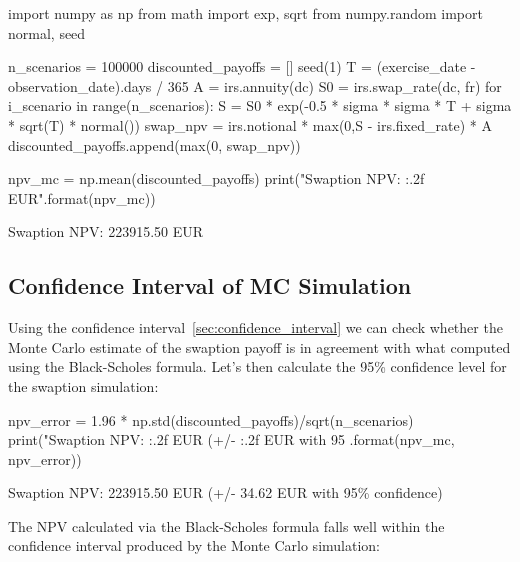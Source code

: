\begin{ipython}
import numpy as np
from math import exp, sqrt
from numpy.random import normal, seed

n_scenarios = 100000
discounted_payoffs = []
seed(1)
T = (exercise_date - observation_date).days / 365
A = irs.annuity(dc)
S0 = irs.swap_rate(dc, fr)
for i_scenario in range(n_scenarios):
    S = S0 * exp(-0.5 * sigma * sigma * T +
        sigma * sqrt(T) * normal())
    swap_npv = irs.notional * max(0,S - irs.fixed_rate) * A
    discounted_payoffs.append(max(0, swap_npv))

npv_mc = np.mean(discounted_payoffs)
print("Swaption NPV: {:.2f} EUR".format(npv_mc))
\end{ipython}
\begin{ioutput}
Swaption NPV: 223915.50 EUR
\end{ioutput}

%

\subsection{Confidence Interval of MC Simulation}

Using the confidence interval~\ref{sec:confidence_interval} we can check whether the Monte Carlo estimate of the swaption payoff is in agreement with what computed using the Black-Scholes formula.
Let's then calculate the 95\% confidence level for the swaption simulation:

\begin{ipython}
npv_error = 1.96 * np.std(discounted_payoffs)/sqrt(n_scenarios)
print("Swaption NPV: {:.2f} EUR (+/- {:.2f} EUR with 95%
    .format(npv_mc, npv_error))
\end{ipython}
\begin{ioutput}
Swaption NPV: 223915.50 EUR (+/- 34.62 EUR with 95\% confidence)
\end{ioutput}

The NPV calculated via the Black-Scholes formula falls well within the confidence interval produced by the Monte Carlo simulation:

